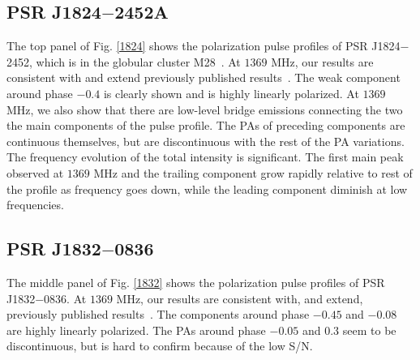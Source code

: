 \documentclass[useAMS,usenatbib]{mn2e}
\begin{document}
\begin{appendices}


\subsection{PSR J1824$-$2452A}

The top panel of Fig. \ref{1824} shows the polarization pulse profiles of 
PSR J1824$-$2452, which is in the globular cluster M28~\citep{Lyne87}.
%
At $1369$ MHz, our results are consistent with and extend previously published 
results~\citep{Yan11}.
%
The weak component around phase $-0.4$ is clearly shown and is highly 
linearly polarized. 
%
At $1369$ MHz, we also show that there are low-level bridge emissions 
connecting the two the main components of the pulse profile.
%
The PAs of preceding components are continuous themselves, but are 
discontinuous with the rest of the PA variations.
%
The frequency evolution of the total intensity is significant. The first 
main peak observed at $1369$ MHz and the trailing component grow rapidly 
relative to rest of the profile as frequency goes down, while the leading 
component diminish at low frequencies.


\subsection{PSR J1832$-$0836}

The middle panel of Fig. \ref{1832} shows the polarization pulse profiles of 
PSR J1832$-$0836.
%
At $1369$ MHz, our results are consistent with, and extend, previously published 
results~\citep{Burgay13}.
%
The components around phase $-0.45$ and $-0.08$ are highly linearly polarized. 
%
The PAs around phase $-0.05$ and $0.3$ seem to be discontinuous, but is hard 
to confirm because of the low S/N.



\end{appendices}
\end{document}
